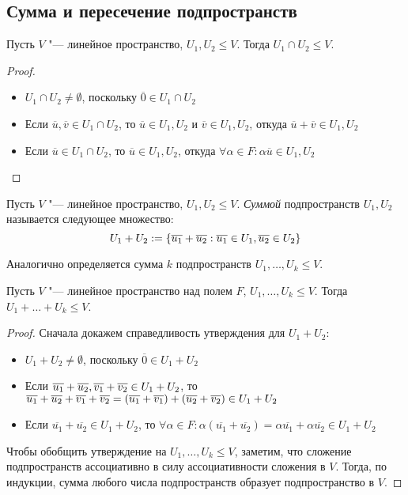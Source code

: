 \subsection{Сумма и пересечение подпространств}

\begin{proposition}
	Пусть $V$ "--- линейное пространство, $U_1, U_2 \le V$. Тогда $U_1 \cap U_2 \le V$.
\end{proposition}

\begin{proof}~
	\begin{itemize}
		\item $U_1 \cap U_2 \ne \emptyset$, поскольку $\overline{0} \in U_1 \cap U_2$
		\item Если $\overline{u}, \overline{v} \in U_1 \cap U_2$, то $\overline{u} \in U_1, U_2$ и $\overline{v} \in U_1, U_2$, откуда $\overline{u} + \overline{v} \in U_1, U_2$
		\item Если $\overline{u} \in U_1 \cap U_2$, то $\overline{u} \in U_1, U_2$, откуда $\forall \alpha \in F: \alpha\overline{u} \in U_1, U_2$\qedhere
	\end{itemize}
\end{proof}

\begin{definition}
	Пусть $V$ "--- линейное пространство, $U_1, U_2 \le V$. \textit{Суммой} подпространств $U_1, U_2$ называется следующее множество:
	\[U_1 + U_2 := \{\overline{u_1} + \overline{u_2}: \overline{u_1} \hm{\in} U_1, \overline{u_2} \in U_2\}\]
	
	Аналогично определяется сумма $k$ подпространств $U_1, \dotsc, U_k \le V$.
\end{definition}

\begin{proposition}
	Пусть $V$ "--- линейное пространство над полем $F$, $U_1, \dots, U_k \le V$. Тогда $U_1 + \dots + U_k \le V$.
\end{proposition}

\begin{proof}
	Сначала докажем справедливость утверждения для $U_1 + U_2$:
	\begin{itemize}
		\item $U_1 + U_2 \ne \emptyset$, поскольку $\overline{0} \in U_1 + U_2$
		\item Если $\overline{u_1} + \overline{u_2}, \overline{v_1} + \overline{v_2} \hm{\in} U_1 + U_2$, то $\overline{u_1} + \overline{u_2} + \overline{v_1} + \overline{v_2} = (\overline{u_1} + \overline{v_1}) \hm{+} (\overline{u_2} + \overline{v_2}) \in U_1 + U_2$
		\item Если $\overline{u_1} + \overline{u_2} \in U_1 + U_2$, то $\forall \alpha \in F: \alpha(\overline{u_1} + \overline{u_2}) = \alpha\overline{u_1} + \alpha\overline{u_2} \in U_1 + U_2$
	\end{itemize}
	
	Чтобы обобщить утверждение на $U_1, \dots, U_k \le V$, заметим, что сложение подпространств ассоциативно в силу ассоциативности сложения в $V$. Тогда, по индукции, сумма любого числа подпространств образует подпространство в $V$.
\end{proof}

